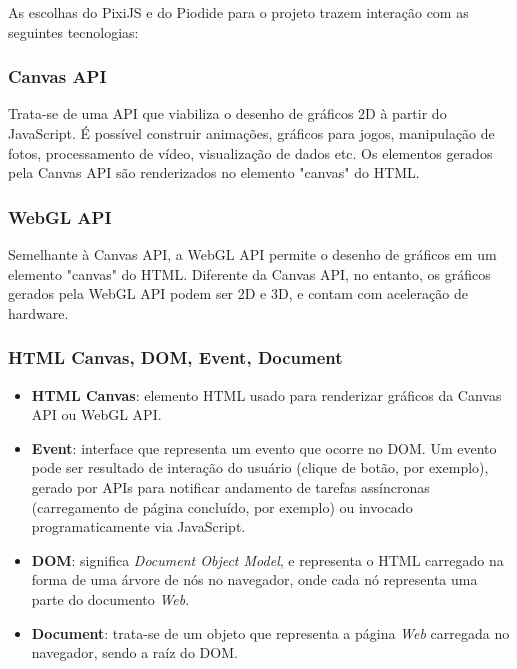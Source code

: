 \begin{apendicesenv}
As escolhas do PixiJS e do Piodide para o projeto trazem interação com as seguintes tecnologias:

\subsubsection{Canvas API}
Trata-se de uma API que viabiliza o desenho de gráficos 2D à partir do JavaScript. É possível construir animações, gráficos para jogos, manipulação de fotos, processamento de vídeo, visualização de dados etc. Os elementos gerados pela Canvas API são renderizados no elemento "canvas" do HTML.

\subsubsection{WebGL API}

Semelhante à Canvas API, a WebGL API permite o desenho de gráficos em um elemento "canvas" do HTML.
Diferente da Canvas API, no entanto, os gráficos gerados pela WebGL API podem ser 2D e 3D, e contam
com aceleração de hardware.

\subsubsection{HTML Canvas, DOM, Event, Document}

\begin{itemize}

	\item \textbf{HTML Canvas}: elemento HTML usado para renderizar gráficos da Canvas API ou WebGL API.
	\item  \textbf{Event}: interface que representa um evento que ocorre no DOM. Um evento pode ser resultado
	de interação do usuário (clique de botão, por exemplo), gerado por APIs para notificar andamento
	de tarefas assíncronas (carregamento de página concluído, por exemplo) ou invocado programaticamente
	via JavaScript.
	\item  \textbf{DOM}: significa \textit{Document Object Model}, e representa o HTML carregado na
	forma de uma árvore de nós no navegador, onde cada nó representa uma parte do documento \textit{Web}.
	\item \textbf{Document}: trata-se de um objeto que representa a página \textit{Web} carregada no
	navegador, sendo a raíz do DOM.

\end{itemize}

%
%


\end{apendicesenv}
